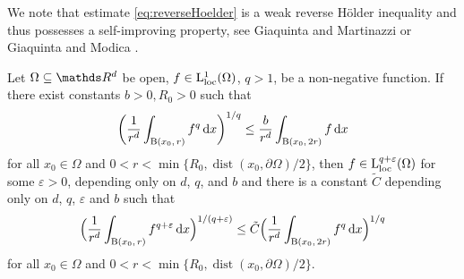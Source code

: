   We note that estimate \eqref{eq:reverseHoelder} is a weak reverse H\"older inequality and thus possesses a self-improving property, see Giaquinta and Martinazzi \cite[Thm. 6.38]{giaquintaMartinazzi} or Giaquinta and Modica \cite[Prop. 5.1]{giaquintaModica}.

  \begin{prop}
    \label{prop:giaquinta}
    Let $\Omega \subseteq \R^d$ be open, $f \in \mathrm{L}^1_{\mathrm{loc}}(\Omega)$, $q > 1$, be a non-negative function.
    If there exist constants $b > 0, R_0 > 0$ such that
    \begin{align*}
      \bigg( \frac{1}{r^d} \int_{\mathrm{B}(x_0,\, r)} f^q \, {\operatorname{d}\!{x}} \bigg)^{1/q} \leq \frac{b}{r^d} \int_{\mathrm{B}(x_0,\, 2r)} f \, {\operatorname{d}\!{x}}
    \end{align*}
    for all $x_0 \in \Omega$ and $0 < r < \min\big\{ R_0, \operatorname{dist}(x_0, \partial\Omega)/2\big\}$, then $f \in \mathrm{L}^{q + \varepsilon}_{\mathrm{loc}}(\Omega)$ for some $\varepsilon > 0$, depending only on $d$, $q$, and $b$ and there is a constant $\tilde C$ depending only on $d$, $q$, $\varepsilon$ and $b$ such that
    \begin{align*}
      \Big( \frac{1}{r^d} \int_{\mathrm{B}(x_0,\, r)} f^{q + \varepsilon} \, {\operatorname{d}\!{x}} \Big)^{1/(q + \varepsilon)} \leq \tilde C \Big( \frac{1}{r^d} \int_{\mathrm{B}(x_0,\, 2r)} f^q \, {\operatorname{d}\!{x}} \Big)^{1/q}
    \end{align*}
    for all $x_0 \in \Omega$ and $0 < r < \min\{R_0, \operatorname{dist}(x_0, \partial\Omega)/2\}$.
  \end{prop}

